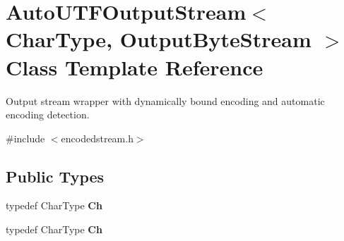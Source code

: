 \hypertarget{classAutoUTFOutputStream}{}\section{Auto\+U\+T\+F\+Output\+Stream$<$ Char\+Type, Output\+Byte\+Stream $>$ Class Template Reference}
\label{classAutoUTFOutputStream}


Output stream wrapper with dynamically bound encoding and automatic encoding detection.  




{\ttfamily \#include $<$encodedstream.\+h$>$}

\subsection*{Public Types}
\begin{DoxyCompactItemize}
\item 
\mbox{\label{classAutoUTFOutputStream_abd8c486101026e11828e86c18991c9c0}} 
typedef Char\+Type {\bfseries Ch}
\item 
\mbox{\label{classAutoUTFOutputStream_abd8c486101026e11828e86c18991c9c0}} 
typedef Char\+Type {\bfseries Ch}
\end{DoxyCompactItemize}
